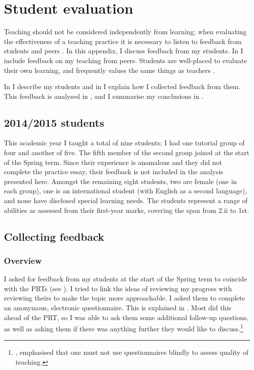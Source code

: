\chapter{Student evaluation}\label{ap:student}

Teaching should not be considered independently from learning; when evaluating the effectiveness of a teaching practice it is necessary to listen to feedback from students and peers \citep[chapter 7]{Ramsden1992}. In this appendix, I discuss feedback from my students. In  I include feedback on my teaching from peers. Students are well-placed to evaluate their own learning, and frequently values the same things as teachers \citep[chapter 6]{Ramsden1992}.

In  I describe my students and in  I explain how I collected feedback from them. This feedback is analysed in , and I summarise my conclusions in .

\section{2014/2015 students}\label{sec:2014-15students}

This academic year I taught a total of nine students; I had one tutorial group of four and another of five. The fifth member of the second group joined at the start of the Spring term. Since their experience is anomalous and they did not complete the practice essay, their feedback is not included in the analysis presented here. Amongst the remaining eight students, two are female (one in each group), one is an international student (with English as a second language), and none have disclosed special learning needs. The students represent a range of abilities as assessed from their first-year marks, covering the span from 2.ii to 1st.

\section{Collecting feedback}\label{sec:questions}

\subsection{Overview}

I asked for feedback from my students at the start of the Spring term to coincide with the PRTs (see ). I tried to link the ideas of reviewing my progress with reviewing theirs to make the topic more approachable. I asked them to complete an anonymous, electronic questionnaire. This is explained in . Most did this ahead of the PRT, so I was able to ask them some additional follow-up questions, as well as asking them if there was anything further they would like to discuss.\footnote{\citet[chapter 11]{Ramsden1992}, emphasised that one must not use questionnaires blindly to assess quality of teaching.}

